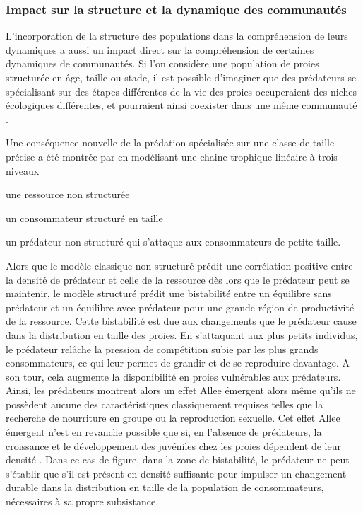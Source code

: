 \subsubsection{Impact sur la structure et la dynamique des communautés}

L'incorporation de la structure des populations dans la compréhension de leurs 
dynamiques a aussi un impact direct sur la compréhension de certaines dynamiques
de communautés. Si l'on considère une population de proies structurée en âge,
taille ou stade, il est possible d'imaginer que des prédateurs se
spécialisant sur des étapes différentes de la vie des proies 
occuperaient des niches écologiques différentes, et pourraient ainsi coexister dans une même
communauté \autocites{de-roos2003b}. 

Une conséquence nouvelle de la prédation spécialisée sur une classe de taille
précise a été montrée par \textcite{de-roos2002a} en modélisant une chaine
trophique linéaire à trois niveaux \begin{enumerate*}[label=(\roman*),
before=\unskip{ : }, itemjoin={{ ; }}, itemjoin*={{ ; et }}]\item une ressource
non structurée \item un consommateur structuré en taille \item un prédateur non
structuré qui s'attaque aux consommateurs de petite taille.\end{enumerate*}
Alors que le modèle classique non structuré prédit une corrélation positive
entre la densité de prédateur et celle de la ressource dès lors que le prédateur
peut se maintenir, le modèle structuré prédit une bistabilité entre un équilibre
sans prédateur et un équilibre avec prédateur pour une grande région de
productivité de la ressource. Cette bistabilité est due aux changements que le
prédateur cause dans la distribution en taille des proies. En s'attaquant aux
plus petits individus, le prédateur relâche la pression de compétition subie par
les plus grands consommateurs, ce qui leur permet de grandir et de se reproduire
davantage.
A son tour, cela augmente la disponibilité en proies vulnérables aux prédateurs.
Ainsi, les prédateurs montrent alors un effet Allee émergent alors même qu'ils
ne possèdent aucune des caractéristiques classiquement requises telles que la
recherche de nourriture en groupe ou la reproduction sexuelle. Cet effet Allee
émergent n'est en revanche possible que si, en l'absence de prédateurs, la
croissance et le développement des juvéniles chez les proies dépendent de leur
densité \autocites{de-roos2003a}. Dans ce cas de figure, dans la zone de
bistabilité, le prédateur ne peut s'établir que s'il est présent en densité
suffisante pour impulser un changement durable dans la distribution en taille de
la population de consommateurs, nécessaires à sa propre subsistance.

